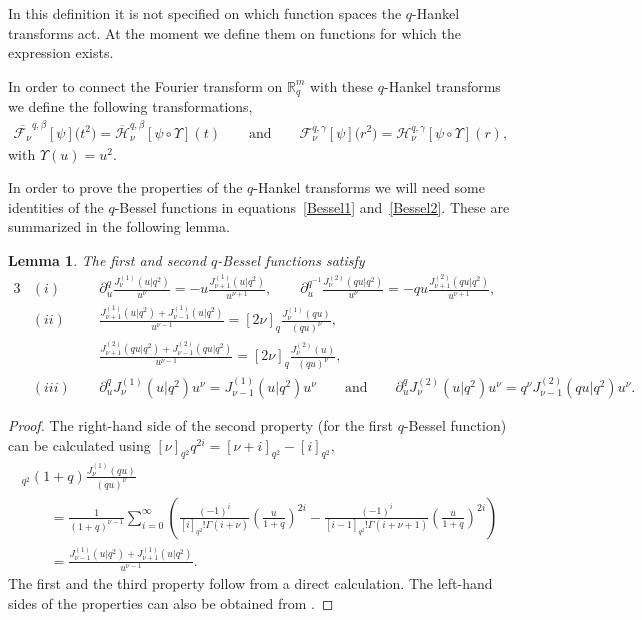 \documentclass[11pt]{article}
\newtheorem{lemma}{Lemma}
\newcommand{\mR}{\mathbb{R}}
\newcommand{\cH}{\mathcal{H}}
\newcommand{\cF}{\mathcal{F}}
\numberwithin{equation}{section}
\begin{document}
In this def\/inition it is not specif\/ied on which function spaces the $q$-Hankel transforms act. At the moment we def\/ine them on functions for which the expression exists.

In order to connect the Fourier transform on $\mR^m_q$ with these $q$-Hankel transforms we def\/ine the following transformations,
\begin{gather*}
\overline{\cF_{\nu}}^{q,\beta}[\psi]\big(t^2\big)=\overline{\cH}_{\nu}^{q,\beta}[\psi\circ\Upsilon](t)
\qquad \mbox{and} \qquad \cF_{\nu}^{q,\gamma}[\psi]\big(r^2\big)=\cH_{\nu}^{q,\gamma}[\psi\circ\Upsilon](r),
\end{gather*}
with $\Upsilon(u)=u^2$.





In order to prove the properties of the $q$-Hankel transforms we will need some identities of the $q$-Bessel functions in equations~\eqref{Bessel1} and~\eqref{Bessel2}. These are summarized in the following lemma.

\begin{lemma}
\label{lemBessel1}
The first and second $q$-Bessel functions satisfy
\begin{alignat*}{3}
& (i)& &\partial_u^q\frac{J_{\nu}^{(1)}(u|q^2)}{u^\nu}=-u\frac{J_{\nu+1}^{(1)}(u|q^2)}{u^{\nu+1}},\qquad \partial_u^{q^{-1}}\frac{J_{\nu}^{(2)}(qu|q^2)}{u^\nu}=-qu\frac{J_{\nu+1}^{(2)}(qu|q^2)}{u^{\nu+1}}, &\\
& (ii)& &\frac{J_{\nu+1}^{(1)}(u|q^2)+J_{\nu-1}^{(1)}(u|q^2)}{u^{\nu-1}}=[2\nu]_q\frac{J_{\nu}^{(1)}(qu)}{(qu)^\nu},& \\ &&& \frac{J_{\nu+1}^{(2)}(qu|q^2)+J_{\nu-1}^{(2)}(qu|q^2)}{u^{\nu-1}}=[2\nu]_q\frac{J_{\nu}^{(2)}(u)}{(qu)^\nu},&\\
& (iii) \ \ & &\partial_u^q J_{\nu}^{(1)}(u|q^2)u^\nu=J_{\nu-1}^{(1)}(u|q^2)u^\nu\qquad
 \mbox{and}\qquad \partial_u^q J_{\nu}^{(2)}(u|q^2)u^\nu=q^\nu J_{\nu-1}^{(2)}(qu|q^2)u^\nu.&
\end{alignat*}
\end{lemma}

\begin{proof}
The right-hand side of the second property (for the f\/irst $q$-Bessel function) can be calculated using $[\nu]_{q^2}q^{2i}=[\nu+i]_{q^2}-[i]_{q^2}$,
\begin{gather*}
[\nu]_{q^2}(1+q)\frac{J_\nu^{(1)}(qu)}{(qu)^\nu} \\
\qquad{}
=\frac{1}{(1+q)^{\nu-1}}\sum_{i=0}^\infty\left(\frac{(-1)^i}{[i]_{q^2}!\Gamma(i+\nu)}\left(\frac{u}{1+q}\right)^{2i}
-\frac{(-1)^i}{[i-1]_{q^2}!\Gamma(i+\nu+1)}\left(\frac{u}{1+q}\right)^{2i}\right)\\
\qquad{} =\frac{J_{\nu-1}^{(1)}(u|q^2)+J_{\nu+1}^{(1)}(u|q^2)}{u^{\nu-1}}.
\end{gather*}
The f\/irst and the third property follow from a direct calculation. The left-hand sides of the properties can also be obtained from \cite[Exercise~1.25]{MR1052153}.
\end{proof}
\end{document}
